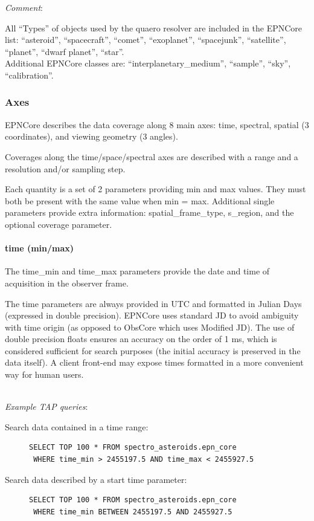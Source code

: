\documentclass[11pt,a4paper]{ivoa}
\begin{document}
\emph{Comment}:

All ``Types'' of objects used by the quaero resolver are included
in the EPNCore list: ``asteroid'', ``spacecraft'', ``comet'',
``exoplanet'', ``spacejunk'', ``satellite'', ``planet'', ``dwarf planet'',
``star''.\\
Additional EPNCore classes are: ``interplanetary\_medium'',
``sample'', ``sky'', ``calibration''.


\subsubsection{Axes}

EPNCore describes the data coverage along 8 main axes:
time, spectral, spatial (3 coordinates), and viewing geometry (3 angles).

Coverages along the time/space/spectral axes are described with a range
and a resolution and/or sampling step.

Each quantity is a set of 2 parameters providing min and max values. They
must both be present with the same value when min = max. Additional single
parameters provide extra information: spatial\_frame\_type, s\_region,
and the optional coverage parameter.

\paragraph{time (min/max)}

The time\_min and time\_max parameters provide the date and time of
acquisition in the observer frame.

The time parameters are always provided in UTC and formatted in Julian
Days (expressed in double precision). EPNCore uses standard JD to avoid
ambiguity with time origin (as opposed to ObsCore which uses Modified
JD). The use of double precision floats ensures an accuracy on the order
of 1 ms, which is considered sufficient for search purposes (the initial
accuracy is preserved in the data itself). A client front-end may expose
times formatted in a more convenient way for human users.

\textbf{\\}
\emph{Example TAP queries}:

\begin{description}
\item[Search data contained in a time range:]\mbox{}
\begin{verbatim}
SELECT TOP 100 * FROM spectro_asteroids.epn_core
 WHERE time_min > 2455197.5 AND time_max < 2455927.5
\end{verbatim}

\item[Search data described by a start time parameter:]\mbox{}
\begin{verbatim}
SELECT TOP 100 * FROM spectro_asteroids.epn_core
 WHERE time_min BETWEEN 2455197.5 AND 2455927.5
\end{verbatim}
\end{description}
\end{document}
